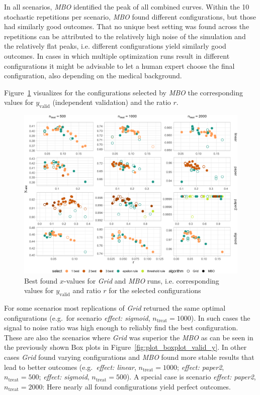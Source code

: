 \documentclass[bimj,fleqn]{w-art}
\theoremstyle{plain}
\theoremstyle{definition}
\begin{document}
In all scenarios, \emph{MBO} identified the peak of all combined curves.
Within the 10 stochastic repetitions per scenario, \emph{MBO} found different configurations, but those had similarly good outcomes.
That no unique best setting was found across the repetitions can be attributed to the relatively high noise of the simulation and the relatively flat peaks, i.e. different configurations yield similarly good outcomes.
In cases in which multiple optimization runs result in different configurations it might be advisable to let a human expert choose the final configuration, also depending on the medical background.

Figure~\ref{fig:plot_best_x} visualizes for the configurations selected by \emph{MBO} the corresponding values for $y_{\text{valid}}$ (independent validation) and the ratio $r$.
\begin{figure}[htb]
\centering
\includegraphics[width=\linewidth]{generated/figures/plot_best_x.pdf}
\caption{Best found $x$-values for \emph{Grid} and \emph{MBO} runs, i.e. corresponding values for $y_{\text{valid}}$ and ratio $r$ for the selected configurations}
\label{fig:plot_best_x}
\end{figure}
For some scenarios most replications of \emph{Grid} returned the same optimal configurations (e.g.\ for scenario \emph{effect: sigmoid}, $n_{\text{treat}} = 1000$).
In such cases the signal to noise ratio was high enough to reliably find the best configuration.
These are also the scenarios where \emph{Grid} was superior the \emph{MBO} as can be seen in the previously shown Box plots in Figure~\ref{fig:plot_boxplot_valid_y}.
In other cases \emph{Grid} found varying configurations and \emph{MBO} found more stable results that lead to better outcomes (e.g.\ \emph{effect: linear}, $n_{\text{treat}} = 1000$; \emph{effect: paper2}, $n_{\text{treat}} = 500$; \emph{effect: sigmoid}, $n_{\text{treat}} = 500$).
A special case is scenario \emph{effect: paper2}, $n_{\text{treat}} = 2000$:
Here nearly all found configurations yield perfect outcomes.
\end{document}
